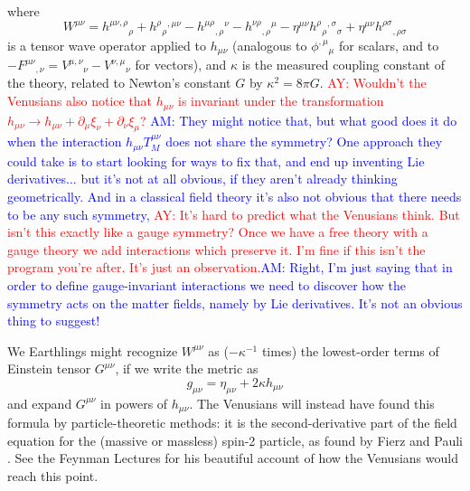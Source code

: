 \documentclass[aps,physrev,preprint,groupedaddress]{revtex4-2}
\newcommand{\AY}[1]{\textcolor{red}{AY: #1}}
\newcommand{\AM}[1]{\textcolor{blue}{AM: #1}}
\begin{document}
where 
\begin{equation} \label{W}
W^{\mu\nu} = h^{\mu\nu,\rho}{}_\rho + h^\rho{}_\rho{}^{,\mu\nu} - h^{\mu\rho}{}_{,\rho}{}^\nu 
- h^{\nu\rho}{}_{,\rho}{}^\mu - \eta^{\mu\nu}h^\rho{}_\rho{}^{,\sigma}{}_\sigma + \eta^{\mu\nu}h^{\rho\sigma}{}_{,\rho\sigma}
\end{equation} 
is a tensor wave operator applied to \(h_{\mu\nu}\) (analogous to \(\phi^{,\mu}{}_\mu\) for scalars, and to \(-F^{\mu\nu}{}_{,\nu}=V^{\mu,\nu}{}_\nu-V^{\nu,\mu}{}_\nu\) for vectors), and \(\kappa\) is the measured coupling constant of the theory, related to Newton's constant \(G\) by \(\kappa^2=8\pi G \). \AY{Wouldn't the Venusians also notice that $h_{\mu\nu}$ is invariant under the transformation $h_{\mu\nu} \to h_{\mu\nu} + \partial_{\mu}\xi_{\nu} + \partial_{\nu}\xi_{\mu}$?} \AM{They might notice that, but what good does it do when the interaction $h_{\mu\nu}T_M^{\mu\nu}$ does not share the symmetry? One approach they could take is to start looking for ways to fix that, and end up inventing Lie derivatives... but it's not at all obvious, if they aren't already thinking geometrically.  And in a classical field theory it's also not obvious that there needs to be any such symmetry, }\AY{It's hard to predict what the Venusians think. But isn't this exactly like a gauge symmetry? Once we have a free theory with a gauge theory we add interactions which preserve it. I'm fine if this isn't the program you're after. It's just an observation.}\AM{Right, I'm just saying that in order to define gauge-invariant interactions we need to discover how the symmetry acts on the matter fields, namely by Lie derivatives. It's not an obvious thing to suggest!}

We Earthlings might recognize \(W^{\mu\nu}\) as {(}\(- \kappa^{- 1}\) times{)} the lowest-order terms of Einstein tensor
\(G^{\mu\nu}\), if we
write the metric as
\begin{equation}
g_{\mu\nu} = \eta_{\mu\nu} + 2\kappa h_{\mu\nu}
\end{equation}
and expand \(G^{\mu\nu}\) in powers of \(h_{\mu\nu}\). The Venusians will
instead have found this formula by particle-theoretic methods: it is the second-derivative part of the field equation for the (massive or massless) spin-2 particle, as found by Fierz and Pauli \cite{FierzPauli}. See the Feynman Lectures\cite{Feynlectures} for his beautiful account of how the Venusians would reach this point.
\end{document}
